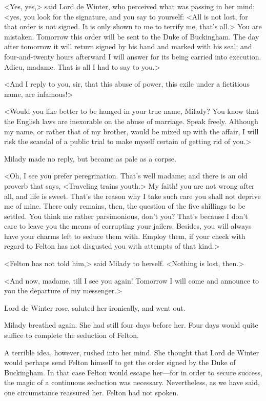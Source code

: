 <Yes, yes,> said Lord de Winter, who perceived what was passing in her mind; <yes, you look for the signature, and you say to yourself: <All is not lost, for that order is not signed. It is only shown to me to terrify me, that's all.> You are mistaken. Tomorrow this order will be sent to the Duke of Buckingham. The day after tomorrow it will return signed by his hand and marked with his seal; and four-and-twenty hours afterward I will answer for its being carried into execution. Adieu, madame. That is all I had to say to you.> 

<And I reply to you, sir, that this abuse of power, this exile under a fictitious name, are infamous!> 

<Would you like better to be hanged in your true name, Milady? You know that the English laws are inexorable on the abuse of marriage. Speak freely. Although my name, or rather that of my brother, would be mixed up with the affair, I will risk the scandal of a public trial to make myself certain of getting rid of you.> 

Milady made no reply, but became as pale as a corpse. 

<Oh, I see you prefer peregrination. That's well madame; and there is an old proverb that says, <Traveling trains youth.> My faith! you are not wrong after all, and life is sweet. That's the reason why I take such care you shall not deprive me of mine. There only remains, then, the question of the five shillings to be settled. You think me rather parsimonious, don't you? That's because I don't care to leave you the means of corrupting your jailers. Besides, you will always have your charms left to seduce them with. Employ them, if your check with regard to Felton has not disgusted you with attempts of that kind.> 

<Felton has not told him,> said Milady to herself. <Nothing is lost, then.> 

<And now, madame, till I see you again! Tomorrow I will come and announce to you the departure of my messenger.> 

Lord de Winter rose, saluted her ironically, and went out. 

Milady breathed again. She had still four days before her. Four days would quite suffice to complete the seduction of Felton. 

A terrible idea, however, rushed into her mind. She thought that Lord de Winter would perhaps send Felton himself to get the order signed by the Duke of Buckingham. In that case Felton would escape her—for in order to secure success, the magic of a continuous seduction was necessary. Nevertheless, as we have said, one circumstance reassured her. Felton had not spoken. 

